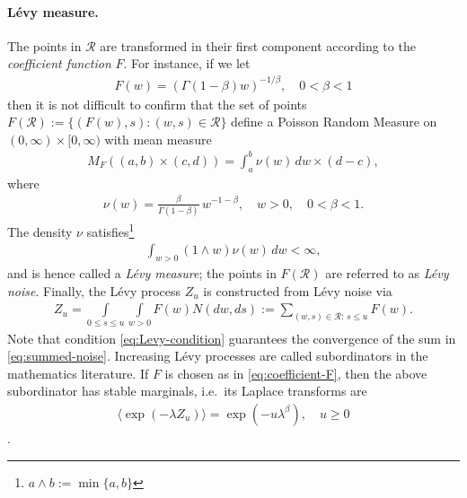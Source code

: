 \documentclass[a4paper,12pt]{article}
\numberwithin{equation}{section}
\theoremstyle{plain}
\theoremstyle{definition}
\theoremstyle{remark}
\numberwithin{equation}{section}
\newcommand{\1}{\mathbf 1}
\begin{document}
\paragraph{L\'evy measure.}
The points in $\mathcal R$ are transformed in their first component according 
to the \emph{coefficient function} $F$.  For instance, if we let 
\begin{align} \label{eq:coefficient-F}
  F(w) = \left( \Gamma(1-\beta) w \right)^{-1/\beta}, \quad 0 < \beta < 1
\end{align}
then it is not difficult to confirm that the set of points 
$F(\mathcal R) := \{(F(w), s): (w,s) \in \mathcal R\}$ 
define a Poisson Random Measure on $(0,\infty) \times [0,\infty)$ with mean 
measure 
\begin{align}
  M_F((a,b) \times (c,d)) = \int_a^b \nu(w)\,dw \times (d-c),
\end{align}
where 
\begin{align} \label{eq:stable-levy-measure}
\nu(w) = \frac{\beta}{\Gamma(1-\beta)} \, w^{-1-\beta}, \quad w > 0, \quad 
0 < \beta < 1.
\end{align}
The density $\nu$ satisfies\footnote{$a \wedge b := \min\{a, b\}$}
\begin{align}
\label{eq:Levy-condition}
\int_{w > 0}(1 \wedge w) \nu(w)\,dw < \infty,  
\end{align}
and is hence called a \emph{L\'evy measure};
the points in $F(\mathcal R)$ are referred to as \emph{L\'evy noise}.
Finally, the L\'evy process $Z_u$ is constructed from L\'evy noise via 
\begin{align} \label{eq:summed-noise}
  Z_u = \int\limits_{0 \le s \le u} \int\limits_{w > 0} F(w) N(dw,ds)
  := \sum_{(w,s) \in \mathcal R:\, s \le u} F(w).
\end{align}
Note that condition \eqref{eq:Levy-condition} guarantees the convergence of the 
sum in \eqref{eq:summed-noise}. 
Increasing L\'evy processes are called subordinators in the mathematics
literature.  If $F$ is chosen as in \eqref{eq:coefficient-F}, then the above 
subordinator has stable marginals, i.e.\ its Laplace 
transforms are 
\begin{align}
  \langle \exp(-\lambda Z_u) \rangle = \exp(-u \lambda^\beta), \quad u \ge 0
\end{align}
\cite{Bertoin04}. 
\end{document}
